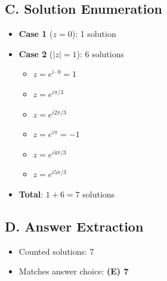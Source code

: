 \documentclass[11pt]{article}
\begin{document}
\begin{conversionbox}
\subsection*{C. Solution Enumeration}
\begin{itemize}[leftmargin=*]
    \item \textbf{Case 1} ($z = 0$): 1 solution
    \item \textbf{Case 2} ($|z| = 1$): 6 solutions
    \begin{itemize}
        \item $z = e^{i\cdot 0} = 1$
        \item $z = e^{i\pi/3}$
        \item $z = e^{i2\pi/3}$
        \item $z = e^{i\pi} = -1$
        \item $z = e^{i4\pi/3}$
        \item $z = e^{i5\pi/3}$
    \end{itemize}
    \item \textbf{Total}: $1 + 6 = 7$ solutions
\end{itemize}

\subsection*{D. Answer Extraction}
\begin{itemize}[leftmargin=*]
    \item Counted solutions: 7
    \item Matches answer choice: \textbf{(E) 7}
\end{itemize}
\end{conversionbox}
\end{document}
